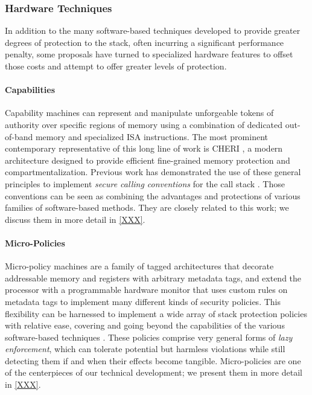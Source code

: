 \subsubsection{Hardware Techniques}

In addition to the many software-based techniques developed to provide greater
degrees of protection to the stack, often incurring a significant performance penalty,
some proposals have turned to specialized hardware features to offset those
costs and attempt to offer greater levels of protection.
%

\paragraph{Capabilities}
%
%
Capability machines can represent and manipulate
unforgeable tokens of authority over specific regions of
memory using a combination of dedicated out-of-band memory and
specialized ISA instructions.
%
The most prominent contemporary representative of this long line of work is
CHERI \cite{}, a modern architecture designed to provide efficient fine-grained
memory protection and compartmentalization.
%
Previous work has demonstrated the use of these general principles  to implement \emph{secure calling conventions} for the call
stack \cite{}. Those conventions can be seen as combining the advantages and
protections of various families of software-based methods.
%
They are closely related  to this work; we discuss them in more
detail in \cref{XXX}.
%

\paragraph{Micro-Policies}
%
%
Micro-policy machines are a family of tagged architectures that decorate
addressable memory and registers with arbitrary metadata tags, and extend the
processor with a programmable hardware monitor that uses custom rules on
metadata tags to implement many different kinds of security policies.
%
This flexibility can be harnessed to implement a wide array of stack protection policies with relative ease, covering and going beyond the capabilities  of the various software-based techniques \cite{} .
%
These policies comprise very general forms of \emph{lazy enforcement}, which can tolerate
potential but harmless violations  while still detecting them if and when their effects
become tangible.
%
Micro-policies are one of the centerpieces of our technical development; we
present them in more detail in \cref{XXX}.

